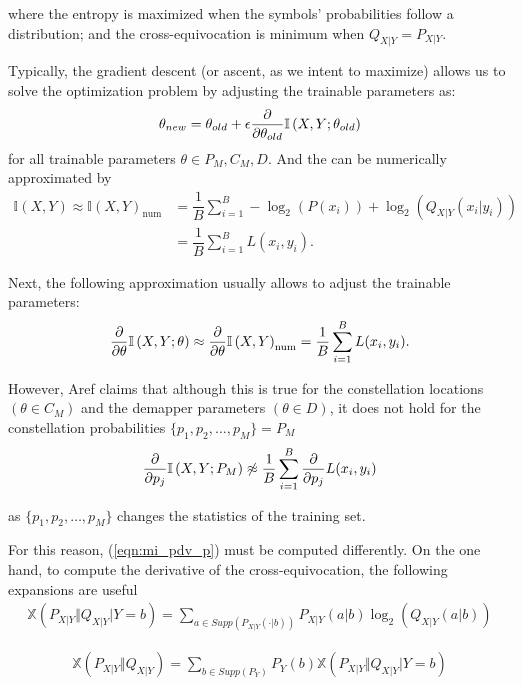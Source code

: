 where the entropy is maximized when the symbols' probabilities follow a  distribution; and the cross-equivocation is minimum when $Q_{X|Y} = P_{X|Y}$.

Typically, the gradient descent (or ascent, as we intent to maximize) allows us to solve the optimization problem by adjusting the trainable parameters as:
\begin{align}
	\theta_{new} = \theta_{old} + \epsilon \pdv{\theta_{old}} \mathbb{I} \left(X , Y ; \theta_{old} \right)
\end{align}
for all trainable parameters $\theta \in P_M, C_M, D$. And the  can be numerically approximated by
\begin{align}
	\mathbb{I} \left(X , Y\right) \approx \mathbb{I} \left(X , Y\right)_{\text{num}} &= \dfrac{1}{B} \sum \limits_{i = 1}^{B} - \log_2(P(x_i)) + \log_2(Q_{X|Y}(x_i|y_i))\\
	&= \dfrac{1}{B} \sum \limits_{i = 1}^{B} L(x_i, y_i).
\end{align}

Next, the following approximation usually allows to adjust the trainable parameters:
\begin{align}
	\pdv{\theta} \mathbb{I} \left(X , Y ; \theta \right) \approx \pdv{\theta} \mathbb{I} \left(X , Y\right)_{\text{num}} = \dfrac{1}{B} \sum \limits_{i = 1}^{B} L(x_i, y_i).
\end{align}

However, Aref claims that although this is true for the constellation locations $(\theta \in C_M)$ and the demapper parameters $(\theta \in D)$, it does not hold for the constellation probabilities $\{p_1, p_2, \dots, p_M\} = P_M$
\begin{align}
\label{eqn:mi_pdv_p}
	\pdv{p_j} \mathbb{I} \left(X , Y ; P_M \right) \not\approx \dfrac{1}{B} \sum \limits_{i = 1}^{B} \pdv{p_j} L(x_i, y_i)
\end{align}

as $\{p_1, p_2, \dots, p_M\}$ changes the statistics of the training set.

For this reason, (\ref{eqn:mi_pdv_p}) must be computed differently. On the one hand, to compute the derivative of the cross-equivocation, the following expansions are useful
\begin{align}
	\mathbb{X}\left(P_{X|Y} \Vert Q_{X|Y} \vert Y=b \right) = \sum \limits_{a \in Supp(P_{X|Y}(\cdot|b))} P_{X|Y}(a|b) \log_2(Q_{X|Y}(a|b))
\end{align}

\begin{align}
	\mathbb{X}\left(P_{X|Y} \Vert Q_{X|Y}\right) = \sum \limits_{b \in Supp(P_Y)} P_Y(b) \mathbb{X}\left( P_{X|Y} \Vert Q_{X|Y} \vert Y=b \right) 
\end{align}

